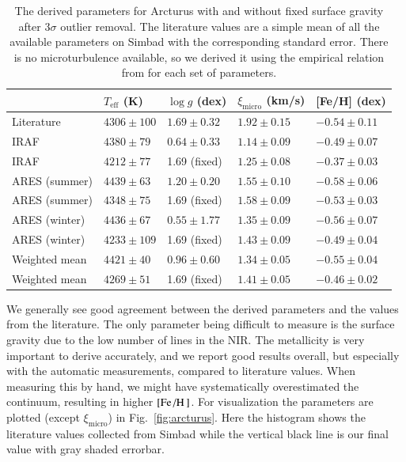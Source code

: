 \documentclass{aa}
\begin{document}
\begin{table}[htb!]
    \caption{The derived parameters for Arcturus with and without fixed surface
             gravity after 3$\sigma$ outlier removal. The literature values are
             a simple mean of all the available parameters on Simbad with the
             corresponding standard error. There is no microturbulence
             available, so we derived it using the empirical relation
             from \citet{Adibekyan2015} for each set of parameters.}
    \label{tab:arcturus}
    \centering
    \begin{tabular}{lllll}
      \hline\hline
                      & $T_\mathrm{eff}$ (K) &  $\log g$ (dex)  &   $\xi_\mathrm{micro}$ (km/s)   & [Fe/H] (dex)     \\
      \hline
        Literature    & $4306 \pm 100$       &  $1.69 \pm 0.32$ &    $1.92 \pm 0.15$              & $-0.54 \pm 0.11$ \\
      \hline
        IRAF          & $4380 \pm  79$       &  $0.64 \pm 0.33$ &    $1.14 \pm 0.09$              & $-0.49 \pm 0.07$ \\
        IRAF          & $4212 \pm  77$       &   1.69 (fixed)   &    $1.25 \pm 0.08$              & $-0.37 \pm 0.03$ \\
      \hline
        ARES (summer) & $4439 \pm  63$       &  $1.20 \pm 0.20$ &    $1.55 \pm 0.10$              & $-0.58 \pm 0.06$ \\
        ARES (summer) & $4348 \pm  75$       &   1.69 (fixed)   &    $1.58 \pm 0.09$              & $-0.53 \pm 0.03$ \\
        ARES (winter) & $4436 \pm  67$       &  $0.55 \pm 1.77$ &    $1.35 \pm 0.09$              & $-0.56 \pm 0.07$ \\
        ARES (winter) & $4233 \pm 109$       &   1.69 (fixed)   &    $1.43 \pm 0.09$              & $-0.49 \pm 0.04$ \\
      \hline
        Weighted mean & $4421 \pm  40$       &  $0.96 \pm 0.60$ &    $1.34 \pm 0.05$              & $-0.55 \pm 0.04$ \\
        Weighted mean & $4269 \pm  51$       &   1.69 (fixed)   &    $1.41 \pm 0.05$              & $-0.46 \pm 0.02$ \\
      \hline
    \end{tabular}
\end{table}

We generally see good agreement between the derived parameters and the values
from the literature. The only parameter being difficult to measure is the
surface gravity due to the low number of  lines in the NIR. The
metallicity is very important to derive accurately, and we report good results
overall, but especially with the automatic measurements, compared to literature
values. When measuring this by hand, we might have systematically overestimated
the continuum, resulting in higher $[\ion{Fe}/\ion{H}]$. For visualization the
parameters are plotted (except $\xi_\mathrm{micro}$) in Fig.~\ref{fig:arcturus}.
Here the histogram shows the literature values collected from Simbad while the
vertical black line is our final value with gray shaded errorbar.
\end{document}
